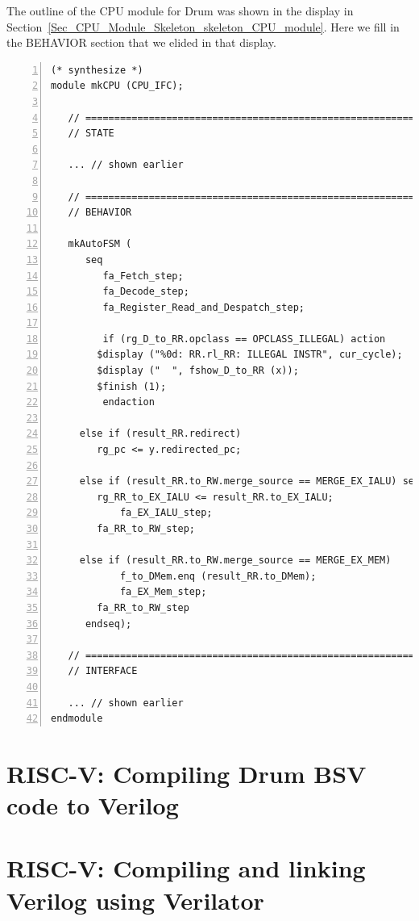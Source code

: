 The outline of the CPU module for Drum was shown in the display in
Section~\ref{Sec_CPU_Module_Skeleton_skeleton_CPU_module}.  Here we
fill in the BEHAVIOR section that we elided in that display.

\begin{Verbatim}[frame=single, numbers=left]
(* synthesize *)
module mkCPU (CPU_IFC);

   // ================================================================
   // STATE

   ... // shown earlier

   // ================================================================
   // BEHAVIOR

   mkAutoFSM (
      seq
         fa_Fetch_step;
         fa_Decode_step;
         fa_Register_Read_and_Despatch_step;

         if (rg_D_to_RR.opclass == OPCLASS_ILLEGAL) action
	    $display ("%0d: RR.rl_RR: ILLEGAL INSTR", cur_cycle);
	    $display ("  ", fshow_D_to_RR (x));
	    $finish (1);
         endaction

	 else if (result_RR.redirect)
	    rg_pc <= y.redirected_pc;

	 else if (result_RR.to_RW.merge_source == MERGE_EX_IALU) seq
	    rg_RR_to_EX_IALU <= result_RR.to_EX_IALU;
            fa_EX_IALU_step;
	    fa_RR_to_RW_step;

	 else if (result_RR.to_RW.merge_source == MERGE_EX_MEM)
            f_to_DMem.enq (result_RR.to_DMem);
            fa_EX_Mem_step;
	    fa_RR_to_RW_step
      endseq);

   // ================================================================
   // INTERFACE

   ... // shown earlier
endmodule

\end{Verbatim}


\section{RISC-V: Compiling Drum BSV code to Verilog}

\label{Sec_FSMs_Drum_compile_to_verilog}


\section{RISC-V: Compiling and linking Verilog using Verilator}

